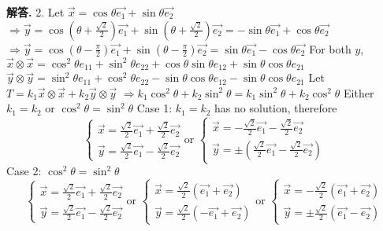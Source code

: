 \documentclass[12pt, a4paper, oneside]{article}
\newenvironment{solution}{\par\noindent\textbf{解答. }}{\par}
\begin{document}
\begin{CJK}{UTF8}{gbsn}
\begin{solution} 2. \newline
  Let $\vec{x} = \cos{\theta}\vec{e_1}+\sin{\theta}\vec{e_2}$ \newline
  $\Rightarrow \vec{y} = \cos{(\theta + \frac{\sqrt{2}}{2})}\vec{e_1}+\sin{(\theta+\frac{\sqrt{2}}{2})}\vec{e_2} = -\sin{\theta}\vec{e_1} + \cos{\theta}\vec{e_2}$ \newline
  $\Rightarrow \vec{y} = \cos{(\theta - \frac{\pi}{2})}\vec{e_1}+\sin{(\theta-\frac{\pi}{2})}\vec{e_2} = \sin{\theta}\vec{e_1} - \cos{\theta}\vec{e_2}$ \newline
  For both $y$, \newline
  $\vec{x}\otimes\vec{x} = \cos^2{\theta}e_{11} + \sin^2{\theta}e_{22} + \cos{\theta}\sin{\theta}e_{12} + \sin{\theta}\cos{\theta}e_{21}$ \newline
  $\vec{y}\otimes\vec{y} = \sin^2{\theta}e_{11} + \cos^2{\theta}e_{22} - \sin{\theta}\cos{\theta}e_{12} - \sin{\theta}\cos{\theta}e_{21}$ \newline 
  Let $T = k_1\vec{x}\otimes\vec{x}+k_2\vec{y}\otimes\vec{y}$ \newline
  $\Rightarrow k_1\cos^2{\theta}+k_2\sin^2{\theta}=k_1\sin^2{\theta}+k_2\cos^2{\theta}$ \newline
  Either $k_1=k_2$ or $\cos^2{\theta} = \sin^2{\theta}$ \newline
  Case 1: $k_1=k_2$ has no solution, therefore
  $$ \begin{cases}
    \vec{x} = \frac{\sqrt{2}}{2}\vec{e_1} + \frac{\sqrt{2}}{2}\vec{e_2} \\
    \vec{y} = \frac{\sqrt{2}}{2}\vec{e_1} - \frac{\sqrt{2}}{2}\vec{e_2} 
  \end{cases} \text{or  } \begin{cases}
    \vec{x} = -\frac{\sqrt{2}}{2}\vec{e_1} - \frac{\sqrt{2}}{2}\vec{e_2} \\
    \vec{y} = \pm\left(\frac{\sqrt{2}}{2}\vec{e_1} - \frac{\sqrt{2}}{2}\vec{e_2}\right)
  \end{cases}$$
  Case 2: $\cos^2{\theta}=\sin^2{\theta}$
  $$ \begin{cases}
    \vec{x} = \frac{\sqrt{2}}{2}\vec{e_1}+\frac{\sqrt{2}}{2}\vec{e_2} \\
    \vec{y} = \frac{\sqrt{2}}{2}\vec{e_1}-\frac{\sqrt{2}}{2}\vec{e_2}
  \end{cases} \text{or  } \begin{cases}
    \vec{x}=\frac{\sqrt{2}}{2}\left(\vec{e_1}+\vec{e_2}\right) \\ 
    \vec{y}=\frac{\sqrt{2}}{2}\left(-\vec{e_1}+\vec{e_2}\right)
  \end{cases} \text{or  } \begin{cases}
    \vec{x}=-\frac{\sqrt{2}}{2}\left(\vec{e_1}+\vec{e_2}\right) \\
    \vec{y}=\pm\frac{\sqrt{2}}{2}\left(\vec{e_1}-\vec{e_2}\right)
  \end{cases}$$ 
\end{solution}


\end{CJK}
\end{document}
